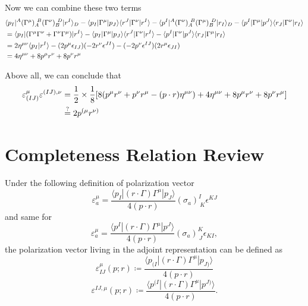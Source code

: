 \documentclass[12pt]{article}
\newcommand{\aket}[1]{|#1\rangle}
\newcommand{\abra}[1]{\langle #1|}
\newcommand{\inner}[2]{\langle #1 | #2 \rangle}
\begin{document}
Now we can combine these two terms
\begin{align}
    &\abra{p_I}^A(\Gamma^\mu)_A^{\ B}(\Gamma^\nu)_B^{\ D}\aket{r^I}_D-\abra{p_I}\Gamma^\mu\aket{p_J}\abra{r^J}\Gamma^\nu\aket{r^I}-\abra {p^I}^A(\Gamma^\nu)_A^{\ B}(\Gamma^\mu)_B^{\ D}\aket{r_I}_D-\abra{p^I}\Gamma^\mu\aket{p^J}\abra{r_J}\Gamma^\nu\aket{r_I}\notag \\
    &=\abra{p_I}(\Gamma^\mu\Gamma^\nu+\Gamma^\nu\Gamma^\mu)\aket{r^I}-\abra{p_I}\Gamma^\mu\aket{p_J}\abra{r^J}\Gamma^\nu\aket{r^I}-\abra{p^I}\Gamma^\nu\aket{p^J}\abra{r_J}\Gamma^\mu\aket{r_I}\notag \\
    &=2\eta^{\mu\nu}\inner{p_I}{r^I}-(2p^\mu\epsilon_{IJ})(-2r^\nu\epsilon^{JI})-(-2p^\nu\epsilon^{IJ})(2r^\mu\epsilon_{JI})\notag \\
    &=4\eta^{\mu\nu}+8p^\mu r^\nu+8p^\nu r^\mu
\end{align}

Above all, we can conclude that 
\begin{align}
    \varepsilon_{(IJ)}^\mu \varepsilon^{(IJ),\nu}&=\frac{1}{2}\times \frac{1}{8}[8(p^\mu r^\nu+p^\nu r^\mu -(p\cdot r)\eta^{\mu\nu})+4\eta^{\mu\nu}+8p^\mu r^\nu+8p^\nu r^\mu]\notag \\
    &\overset{?}{=}2p^{(\mu}r^{\nu)}
\end{align}

\section{Completeness Relation Review}
Under the following definition of polarization vector
\begin{equation}
    \varepsilon_a^\mu=\frac{\abra{p_I}(r\cdot \Gamma)\Gamma^\mu\aket{p_J}}{4(p\cdot r)}(\sigma_a)^I_{\ K}\epsilon^{KJ}
\end{equation}
and same for 
\begin{equation}
    \varepsilon_a^\mu=\frac{\abra{p^I}(r\cdot \Gamma)\Gamma^\mu\aket{p^J}}{4(p\cdot r)}(\sigma_a)^K_{\ J}\epsilon_{KI},
\end{equation}
the polarization vector living in the adjoint representation can be defined as
\begin{equation}
    \varepsilon^\mu_{IJ}(p;r)\coloneqq \frac{\abra{p_{(I}}(r\cdot \Gamma)\Gamma^\mu\aket{p_{J)}}}{4(p\cdot r)}
\end{equation}
\begin{equation}
    \varepsilon^{IJ,\mu}(p;r)\coloneqq \frac{\abra{p^{(I}}(r\cdot \Gamma)\Gamma^\mu\aket{p^{J)}}}{4(p\cdot r)}.
\end{equation}
\end{document}
